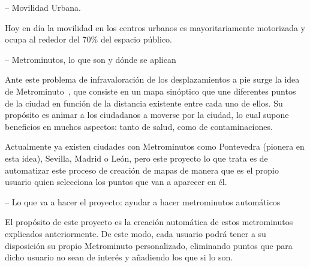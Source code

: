 -- Movilidad Urbana.

Hoy en día la movilidad en los centros urbanos es mayoritariamente motorizada y ocupa al rededor del 70\% del espacio público.


-- Metrominutos, lo que son y dónde se aplican

Ante este problema de infravaloración de los desplazamientos a pie surge la idea de  Metrominuto~\cite{metrominuto}, que consiste en un mapa sinóptico que une diferentes puntos de la ciudad en función de la distancia existente entre cada uno de ellos. Su propósito es animar a los ciudadanos a moverse por la ciudad, lo cual supone beneficios en muchos aspectos: tanto de salud, como de contaminaciones.

Actualmente ya existen ciudades con Metrominutos como Pontevedra (pionera en esta idea), Sevilla, Madrid o León, pero este proyecto lo que trata es de automatizar este proceso de creación de mapas de manera que es el propio usuario quien selecciona los puntos que van a aparecer en él.



-- Lo que va a hacer el proyecto: ayudar a hacer metrominutos automáticos

El propósito de este proyecto es la creación automática de estos metrominutos explicados anteriormente. De este modo, cada usuario podrá tener a su disposición su propio Metrominuto personalizado, eliminando puntos que para dicho usuario no sean de interés y añadiendo los que si lo son.
